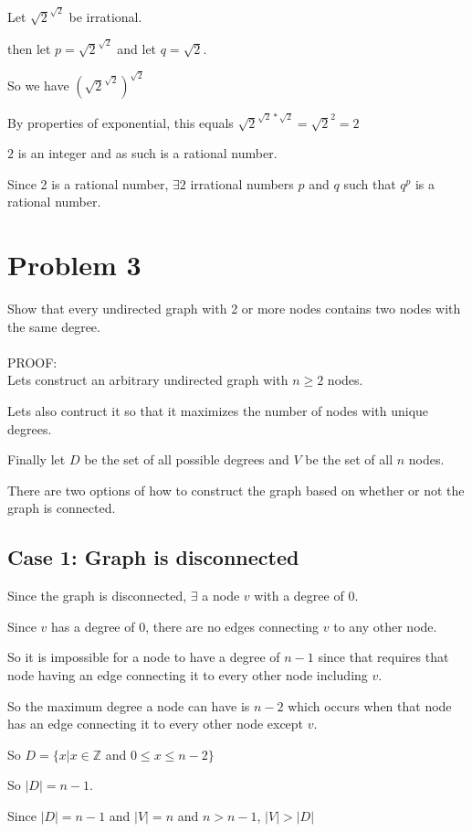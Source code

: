 \documentclass[letterpaper, 11pt]{article}
\begin{document}
Let $\sqrt{2}^{\sqrt{2}}$ be irrational.

then let $p = \sqrt{2}^{\sqrt{2}}$ and let $q = \sqrt{2}$.

So we have $(\sqrt{2}^{\sqrt{2}})^{\sqrt{2}}$

By properties of exponential, this equals $\sqrt{2}^{\sqrt{2}*\sqrt{2}} = \sqrt{2}^{2} = 2$

$2$ is an integer and as such is a rational number.

Since 2 is a rational number, $\exists 2$ irrational numbers $p$ and $q$ such that $q^{p}$ is a rational number.
\newpage

\section{Problem 3}
Show that every undirected graph with 2 or more nodes contains two nodes with the same
degree.\\\\
PROOF:\\
Lets construct an arbitrary undirected graph with $n \geq 2$ nodes.

Lets also contruct it so that it maximizes the number of nodes with unique degrees.

Finally let $D$ be the set of all possible degrees and $V$ be the set of all $n$ nodes.

There are two options of how to construct the graph based on whether or not the graph is connected.

\subsection*{Case 1: Graph is disconnected}
Since the graph is disconnected, $\exists$ a node $v$ with a degree of $0$.

Since $v$ has a degree of $0$, there are no edges connecting $v$ to any other node.

So it is impossible for a node to have a degree of $n-1$ since that requires that node having an edge connecting it to every other node including $v$.

So the maximum degree a node can have is $n-2$ which occurs when that node has an edge connecting it to every other node except $v$.

So $D = \{x | x \in \mathbb{Z}$ and $0 \leq x \leq n-2\}$

So $|D| = n-1$.

Since $|D| = n-1$ and $|V| = n$ and $n > n-1$, $|V| > |D|$
\end{document}
